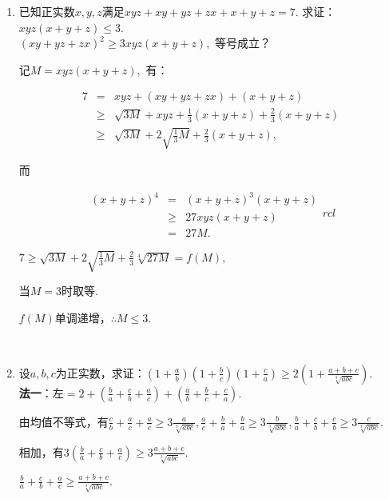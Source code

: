 \documentclass[8pt]{article}
\begin{document}
\begin{enumerate}
		~\\

		\item 已知正实数$x, y, z$满足$xyz+xy+yz+zx+x+y+z=7$. 求证：$xyz(x+y+z)\leq 3$.
			~\\

			$(xy+yz+zx)^2\geq 3xyz(x+y+z),$ 等号成立？

			记$M=xyz(x+y+z),$ 有：

			$$
			\begin{array}{rcl}
				7&=&xyz+(xy+yz+zx)+(x+y+z)\\
				 &\geq&\sqrt{3M}+xyz+\displaystyle\frac{1}{3}(x+y+z)+\frac{2}{3}(x+y+z)\\
				 &\geq&\sqrt{3M}+2\sqrt{\frac{1}{3}M}+\frac{2}{3}(x+y+z),
			\end{array}
			$$

			而

			$$
			\begin{array}{rcl}
				(x+y+z)^4&=&(x+y+z)^3(x+y+z)\\
				&\geq&27xyz(x+y+z)\\
				&=&27M.
			\end{array}{rcl}
			$$

			$7\geq\sqrt{3M}+2\sqrt{\frac{1}{3}M}+\frac{2}{3}\sqrt[4]{27M}=f(M),$

			当$M=3$时取等.

			$f(M)$单调递增，$\therefore M\leq 3$.

		~\\

		\item 设$a, b, c$为正实数，求证：$\displaystyle \left(1+\frac{a}{b}\right)\left(1+\frac{b}{c}\right)\left(1+\frac{c}{a}\right)\geq2\left(1+\frac{a+b+c}{\sqrt[3]{abc}}\right).$
			~\\

			\textbf{法一}：$\text{左}=2+\displaystyle\left(\frac{b}{a}+\frac{c}{b}+\frac{a}{c}\right)+\left(\frac{a}{b}+\frac{b}{c}+\frac{c}{a}\right).$

			由均值不等式，有$\displaystyle \frac{c}{b}+\frac{a}{c}+\frac{a}{c}\geq 3\frac{a}{\sqrt[3]{abc}}, \frac{a}{c}+\frac{b}{a}+\frac{b}{a}\geq3\frac{b}{\sqrt[3]{abc}}, \frac{b}{a}+\frac{c}{b}+\frac{c}{b}\geq3\frac{c}{\sqrt[3]{abc}}.$

			相加，有$\displaystyle 3\left(\frac{b}{a}+\frac{c}{b}+\frac{a}{c}\right)\geq3\frac{a+b+c}{\sqrt[3]{abc}}.$

			$\displaystyle \frac{b}{a}+\frac{c}{b}+\frac{a}{c}\geq\frac{a+b+c}{\sqrt[3]{abc}}.$


\end{enumerate}
\end{document}
